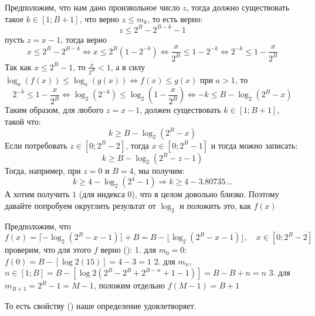 Предположим, что нам дано произвольное число \(z\), тогда должно существовать такое \(k \in [1; B+1]\), что верно \(z \le m_k\), то есть верно:
\begin{dmath*}
 z \le  2^{B} - 2^{B-k} - 1
\end{dmath*}
пусть \(z = x - 1\), тогда верно 
\begin{dmath*}
    x \le 2^{B} - 2^{B-k} \Leftrightarrow x \le 2^B (1 - 2^{-k})
    \Leftrightarrow 
    \frac{x}{2^B} \le 1 - 2^{-k} \Leftrightarrow
    2^{-k} \le 1 - \frac{x}{2^B} 
\end{dmath*}
Так как \(x \le 2^B - 1\), то  \(\frac{x}{2^B} < 1\), а в силу \(\log_a(f(x))  \le \log_a(g(x)) \iff f(x) \le g(x)\) при \(a>1\), то 
\begin{dmath*}
2^{-k} \le 1 - \frac{x}{2^B}  \iff \log_2\left(2^{-k}\right) \le \log_2\left(1 - \frac{x}{2^B}\right) 
\Leftrightarrow -k  \le B - \log_2\left(2^B - x\right) 
\end{dmath*}
Таким образом, для любого \(z = x - 1\), должен существовать \(k \in [1; B+1]\), такой что:
\begin{dmath*}
k \ge B - \log_2\left(2^B - x\right) 
\end{dmath*}
Если потребовать \(z \in [0; 2^B - 2]\), тогда \(x \in  [0; 2^B - 1]\) и тогда можно записать:
\begin{dmath*}
k \ge B - \log_2\left(2^B - z - 1\right) 
\end{dmath*}
Тогда, например, при \(z = 0\) и \(B = 4\), мы получим:
\begin{dmath*}
k \ge 4 - \log_2\left(2^4  - 1\right) \Rightarrow k \ge 4 - 3.80735...
\end{dmath*}
А хотим получить \(1\) (для индекса \(0\)), что в целом довольно близко. Поэтому давайте попробуем округлить результат от \(\log_2\) и положить это, как \(f(x)\) 

Предположим, что 
\begin{dmath}[labelN={4}]
    f(x) = \lceil -\log_2 \left(2^B - x -1\right)\rceil  + B
    = B - \lfloor \log_2(2^B - x - 1)\rfloor,\quad x \in [0; 2^B - 2]
\end{dmath}
проверим, что для этого \(f\) верно ():
1. для \(m_0 = 0\): \(f(0) = B - \left[\log2\left(15\right)\right] = 4 - 3 = 1\)
2. для \(m_n\), \(n \in [1;B] = B - \left[\log2\left(2^B - 2^B + 2^{B-n} + 1 -1 \right)\right] = B - B  + n = n\)
3. для \(m_{B+1} = 2^B - 1 = M - 1\), положим отдельно \(f(M-1) = B+1\)

То есть свойству () наше определение удовлетворяет. 

